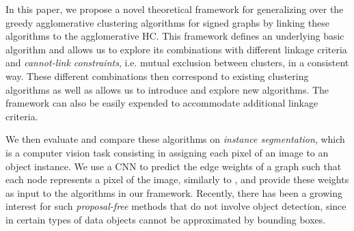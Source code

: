 
In this paper, we propose a novel theoretical framework for generalizing over the greedy agglomerative clustering algorithms for signed graphs by linking these algorithms to the agglomerative HC. This framework defines an underlying basic algorithm and allows us to explore its combinations with different linkage criteria and \emph{cannot-link constraints}, i.e. mutual exclusion between clusters, in a consistent way. These different combinations then correspond to existing clustering algorithms as well as allows us to introduce and explore new algorithms. The framework can also be easily expended to accommodate additional linkage criteria.


We then evaluate and compare these algorithms on \emph{instance segmentation}, which is a computer vision task consisting in assigning each pixel of an image to an object instance. %
We use a CNN to predict the edge weights of a graph such that each node represents a pixel of the image, similarly to \cite{liu2018affinity,lee2017superhuman,wolf2018mutex}, and provide these weights as input to the algorithms in our framework.
Recently, there has been a growing interest for such \emph{proposal-free} methods that do not involve object detection, since in certain types of data objects cannot be approximated by bounding boxes.

